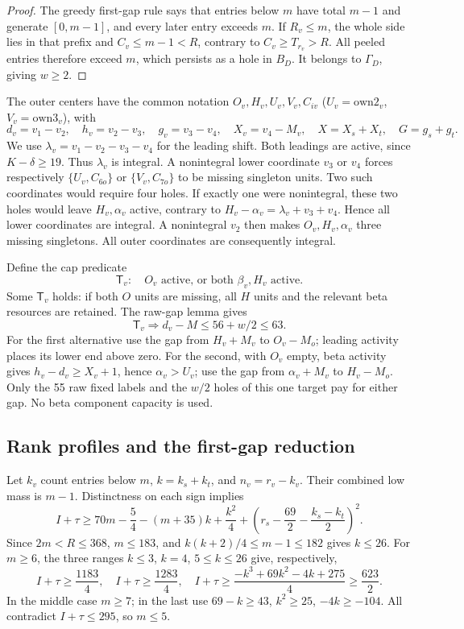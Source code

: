\documentclass[11pt,letterpaper]{article}
\theoremstyle{definition}\newtheorem{definition}[theorem]{Definition}
\begin{document}
\begin{proof}
The greedy first-gap rule says that entries below $m$ have total $m-1$
and generate $[0,m-1]$, and every later entry exceeds $m$.
If $R_v\le m$, the whole side lies in that prefix and
$C_v\le m-1<R$, contrary to $C_v\ge T_{r_v}>R$.
All peeled entries therefore exceed $m$, which persists as a hole in
$B_D$. It belongs to $\Gamma_D$, giving $w\ge2$.
\end{proof}

The outer centers have the common notation $O_v,H_v,U_v,V_v,C_{iv}$
($U_v=\mathrm{own2}_v$, $V_v=\mathrm{own3}_v$), with
\[
 d_v=v_1-v_2,\quad h_v=v_2-v_3,\quad g_v=v_3-v_4,\quad
 X_v=v_4-M_v,\quad X=X_s+X_t,\quad G=g_s+g_t.
\]
We use $\lambda_v=v_1-v_2-v_3-v_4$ for the leading shift.
Both leadings are active, since $K-\delta\ge19$. Thus $\lambda_v$ is
integral. A nonintegral lower coordinate $v_3$ or $v_4$ forces respectively
$\{U_v,C_{6o}\}$ or $\{V_v,C_{7o}\}$ to be missing singleton units.
Two such coordinates would require four holes. If exactly one were
nonintegral, these two holes would leave $H_v,\alpha_v$ active, contrary
to $H_v-\alpha_v=\lambda_v+v_3+v_4$. Hence all lower coordinates are
integral. A nonintegral $v_2$ then makes $O_v,H_v,\alpha_v$ three missing
singletons. All outer coordinates are consequently integral.

Define the cap predicate
\[
 \mathsf T_v:\quad O_v\text{ active, or both }\beta_v,H_v\text{ active}.
\]
Some $\mathsf T_v$ holds: if both $O$ units are missing, all $H$ units and
the relevant beta resources are retained. The raw-gap lemma gives
\begin{equation}
 \mathsf T_v\Longrightarrow d_v-M\le56+w/2\le63.
 \label{eq:p2-cap}
\end{equation}
For the first alternative use the gap from $H_v+M_v$ to $O_v-M_o$;
leading activity places its lower end above zero. For the second, with
$O_v$ empty, beta activity gives $h_v-d_v\ge X_v+1$, hence
$\alpha_v>U_v$; use the gap from $\alpha_v+M_v$ to $H_v-M_o$.
Only the 55 raw fixed labels and the $w/2$ holes of this one target pay
for either gap. No beta component capacity is used.

\subsection{Rank profiles and the first-gap reduction}
Let $k_v$ count entries below $m$, $k=k_s+k_t$, and $n_v=r_v-k_v$.
Their combined low mass is $m-1$. Distinctness on each sign implies
\begin{equation}
 I+\tau\ge70m-\frac54-(m+35)k+\frac{k^2}{4}
 +\left(r_s-\frac{69}{2}-\frac{k_s-k_t}{2}\right)^2.
 \label{eq:p2-lowmass}
\end{equation}
Since $2m<R\le368$, $m\le183$, and
$k(k+2)/4\le m-1\le182$ gives $k\le26$.
For $m\ge6$, the three ranges $k\le3$, $k=4$, $5\le k\le26$ give,
respectively,
\[
 I+\tau\ge\frac{1183}{4},\quad
 I+\tau\ge\frac{1283}{4},\quad
 I+\tau\ge\frac{-k^3+69k^2-4k+275}{4}\ge\frac{623}{2}.
\]
In the middle case $m\ge7$; in the last use
$69-k\ge43$, $k^2\ge25$, $-4k\ge-104$.
All contradict $I+\tau\le295$, so $m\le5$.
\end{document}
